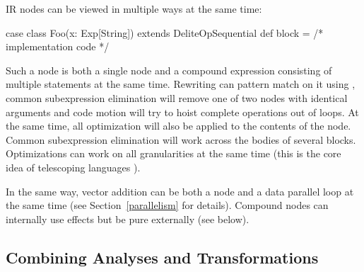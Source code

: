 



IR nodes can be viewed in multiple ways at the same time:
\begin{listing}
case class Foo(x: Exp[String]) extends DeliteOpSequential {
  def block = { /* implementation code */ } }
\end{listing}
Such a node is both a single  node and a compound expression
consisting of multiple statements at the same time. Rewriting can pattern match
on it using , common subexpression elimination will remove one
of two  nodes with identical arguments  and code motion will
try to hoist complete  operations out of loops.  At the same time, all
optimization will also be applied to the contents of the node. Common
subexpression elimination will work across the bodies of several 
blocks. Optimizations can work on all granularities at the same time (this is
the core idea of telescoping languages \cite{kennedy05telescoping}).

In the same way, vector addition can be both a  node and a data
parallel loop at the same time (see Section~\ref{parallelism} for
details). Compound nodes can internally use effects but be pure externally (see
below).



\subsection{Combining Analyses and Transformations}

